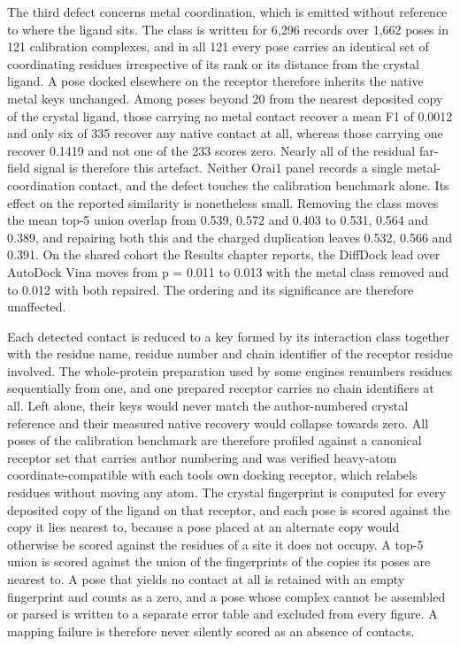 The third defect concerns metal coordination, which is emitted without reference to where the ligand sits. The class is written for 6,296 records over 1,662 poses in 121 calibration complexes, and in all 121 every pose carries an identical set of coordinating residues irrespective of its rank or its distance from the crystal ligand. A pose docked elsewhere on the receptor therefore inherits the native metal keys unchanged. Among poses beyond 20\angstrom{} from the nearest deposited copy of the crystal ligand, those carrying no metal contact recover a mean F1 of 0.0012 and only six of 335 recover any native contact at all, whereas those carrying one recover 0.1419 and not one of the 233 scores zero. Nearly all of the residual far-field signal is therefore this artefact. Neither Orai1 panel records a single metal-coordination contact, and the defect touches the calibration benchmark alone. Its effect on the reported similarity is nonetheless small. Removing the class moves the mean top-5 union overlap from 0.539, 0.572 and 0.403 to 0.531, 0.564 and 0.389, and repairing both this and the charged duplication leaves 0.532, 0.566 and 0.391. On the shared cohort the Results chapter reports, the DiffDock lead over AutoDock Vina moves from p = 0.011 to 0.013 with the metal class removed and to 0.012 with both repaired. The ordering and its significance are therefore unaffected.

Each detected contact is reduced to a key formed by its interaction class together with the residue name, residue number and chain identifier of the receptor residue involved. The whole-protein preparation used by some engines renumbers residues sequentially from one, and one prepared receptor carries no chain identifiers at all. Left alone, their keys would never match the author-numbered crystal reference and their measured native recovery would collapse towards zero. All poses of the calibration benchmark are therefore profiled against a canonical receptor set that carries author numbering and was verified heavy-atom coordinate-compatible with each tool\textquotesingle s own docking receptor, which relabels residues without moving any atom. The crystal fingerprint is computed for every deposited copy of the ligand on that receptor, and each pose is scored against the copy it lies nearest to, because a pose placed at an alternate copy would otherwise be scored against the residues of a site it does not occupy. A top-5 union is scored against the union of the fingerprints of the copies its poses are nearest to. A pose that yields no contact at all is retained with an empty fingerprint and counts as a zero, and a pose whose complex cannot be assembled or parsed is written to a separate error table and excluded from every figure. A mapping failure is therefore never silently scored as an absence of contacts.

